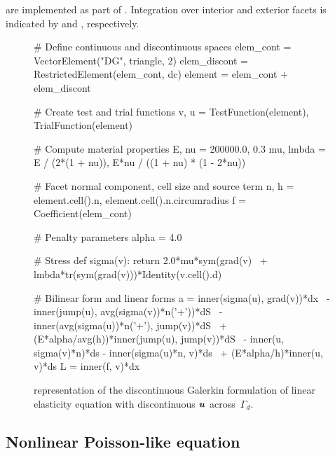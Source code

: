 are implemented as part of \ufl{}. Integration over interior and exterior
facets is indicated by  and , respectively.
%
\begin{figure}
\begin{python}
# Define continuous and discontinuous spaces
elem_cont    = VectorElement("DG", triangle, 2)
elem_discont = RestrictedElement(elem_cont, dc)
element      = elem_cont + elem_discont

# Create test and trial functions
v, u = TestFunction(element), TrialFunction(element)

# Compute material properties
E, nu     = 200000.0, 0.3
mu, lmbda = E / (2*(1 + nu)), E*nu / ((1 + nu) * (1 - 2*nu))

# Facet normal component, cell size and source term
n, h = element.cell().n, element.cell().n.circumradius
f = Coefficient(elem_cont)

# Penalty parameters
alpha = 4.0

# Stress
def sigma(v):
   return 2.0*mu*sym(grad(v) \
        + lmbda*tr(sym(grad(v)))*Identity(v.cell().d)

# Bilinear form and linear forms
a = inner(sigma(u), grad(v))*dx \
  - inner(jump(u), avg(sigma(v))*n('+'))*dS \
  - inner(avg(sigma(u))*n('+'), jump(v))*dS \
  + (E*alpha/avg(h))*inner(jump(u), jump(v))*dS \
  - inner(u, sigma(v)*n)*ds - inner(sigma(u)*n, v)*ds \
  + (E*alpha/h)*inner(u, v)*ds
L = inner(f, v)*dx
\end{python}
\caption{{\ufl} representation of the discontinuous Galerkin formulation of
linear elasticity equation with discontinuous $\boldsymbol{u}$ across~$\Gamma_{d}$.}
\label{code:nikbakht:dg-elasticity}
\end{figure}
\subsection{Nonlinear Poisson-like equation}

